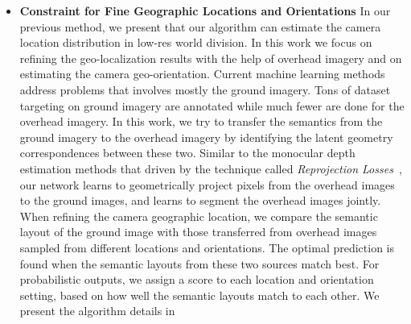 \begin{itemize}[noitemsep]
  \item \textbf{Constraint for Fine Geographic Locations and Orientations}
  In our previous method, we present that our algorithm can estimate
  the camera location distribution in low-res world division. In this
  work we focus on refining the geo-localization results with the help
  of overhead imagery and on estimating the camera geo-orientation.
  Current machine learning methods address problems that involves mostly
  the ground imagery. Tons of dataset targeting on ground imagery are
  annotated while much fewer are done for the overhead imagery.
  In this work, we try to transfer the semantics from the ground imagery
  to the overhead imagery by identifying the latent geometry
  correspondences between these two. Similar to the monocular depth
  estimation methods that driven by
  the technique called {\em Reprojection
  Losses}~\cite{garg2016unsupervised,
  godard2017unsupervised,zhou2017unsupervised, yan2016perspective}, our
  network learns to geometrically project pixels from the overhead
  images to the ground images,
  and learns to segment the overhead images jointly. 
  When refining the camera geographic location, we compare the
  semantic layout of the ground image with those transferred from
  overhead images sampled from different locations and orientations. The
  optimal prediction is found when the semantic layouts from these
  two sources match best. For probabilistic outputs, we assign
  a score to each location and orientation setting,
  based on how well the semantic layouts match to each other.
  We present the algorithm details in 
  \newline

\end{itemize}
